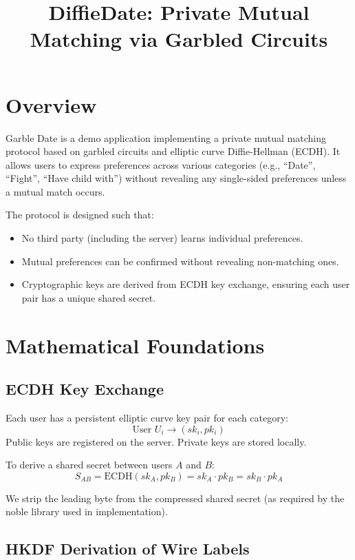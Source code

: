 \documentclass[12pt]{article}
\title{DiffieDate: Private Mutual Matching via Garbled Circuits}
\author{}
\date{}
\begin{document}
\maketitle

\section*{Overview}

Garble Date is a demo application implementing a private mutual matching protocol based on garbled circuits and elliptic curve Diffie-Hellman (ECDH). It allows users to express preferences across various categories (e.g., ``Date'', ``Fight'', ``Have child with'') without revealing any single-sided preferences unless a mutual match occurs.

The protocol is designed such that:
\begin{itemize}
  \item No third party (including the server) learns individual preferences.
  \item Mutual preferences can be confirmed without revealing non-matching ones.
  \item Cryptographic keys are derived from ECDH key exchange, ensuring each user pair has a unique shared secret.
\end{itemize}

\vspace{1em}

\section*{Mathematical Foundations}

\subsection*{ECDH Key Exchange}

Each user has a persistent elliptic curve key pair for each category:
\[
\text{User } U_i \rightarrow (sk_i, pk_i)
\]
Public keys are registered on the server. Private keys are stored locally.

To derive a shared secret between users $A$ and $B$:
\[
S_{AB} = \text{ECDH}(sk_A, pk_B) = sk_A \cdot pk_B = sk_B \cdot pk_A
\]

We strip the leading byte from the compressed shared secret (as required by the noble library used in implementation).

\subsection*{HKDF Derivation of Wire Labels}
\end{document}

